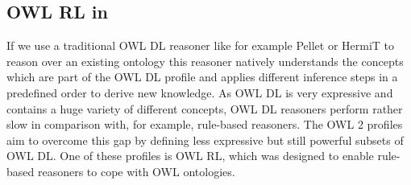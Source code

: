 \subsection{OWL RL in \nthree}\label{owlrln3}
If we use a traditional OWL DL reasoner like for example Pellet \cite{Pellet} or HermiT \cite{hermit} to reason over an existing ontology 
this reasoner 
natively understands the concepts which are part of the OWL DL profile and applies 
different inference steps in a predefined order to derive new knowledge. %
%  
% 
% 
% 
% 
% 
As OWL DL is very expressive and contains a huge variety of different concepts, OWL DL reasoners perform rather slow in comparison with, for example, rule-based reasoners. 
The OWL 2 profiles \cite{OWLRL} aim to overcome this gap 
by defining less expressive
but still powerful subsets of OWL DL. One of these profiles is OWL RL, which was designed to enable rule-based reasoners to cope with OWL ontologies. 


